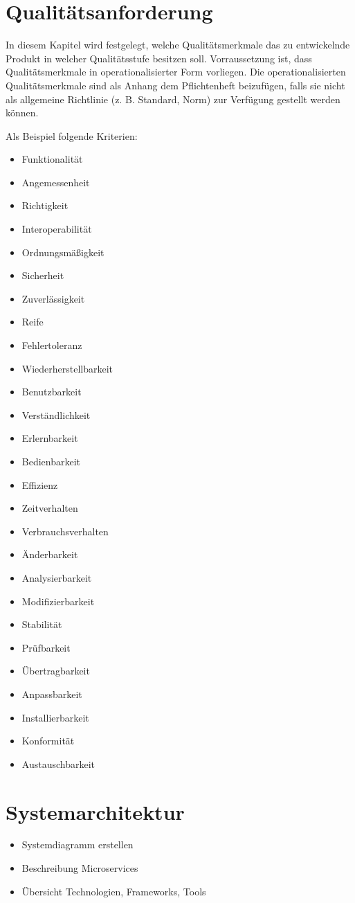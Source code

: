 \documentclass[%
	ngerman,
	12pt,
	a4paper,
	oneside,
	parskip=full
]{scrbook}
\begin{document}
\chapter{Qualitätsanforderung}
In diesem Kapitel wird festgelegt, welche Qualitätsmerkmale das zu entwickelnde Produkt in
welcher Qualitätsstufe besitzen soll. Vorraussetzung ist, dass Qualitätsmerkmale in
operationalisierter Form vorliegen. Die operationalisierten Qualitätsmerkmale sind als
Anhang dem Pflichtenheft beizufügen, falls sie nicht als allgemeine Richtlinie (z. B. Standard,
Norm) zur Verfügung gestellt werden können.

Als Beispiel folgende Kriterien:

\begin{itemize}
	\item Funktionalität
	\item Angemessenheit
	\item Richtigkeit
	\item Interoperabilität
	\item Ordnungsmäßigkeit
	\item Sicherheit
	\item Zuverlässigkeit
	\item Reife
	\item Fehlertoleranz
	\item Wiederherstellbarkeit
	\item Benutzbarkeit
	\item Verständlichkeit
	\item Erlernbarkeit
	\item Bedienbarkeit
	\item Effizienz
	\item Zeitverhalten
	\item Verbrauchsverhalten
	\item Änderbarkeit
	\item Analysierbarkeit
	\item Modifizierbarkeit
	\item Stabilität
	\item Prüfbarkeit
	\item Übertragbarkeit
	\item Anpassbarkeit
	\item Installierbarkeit
	\item Konformität
	\item Austauschbarkeit
\end{itemize}

\chapter{Systemarchitektur}
\begin{itemize}
	\item Systemdiagramm erstellen
	\item Beschreibung Microservices
	\item Übersicht Technologien, Frameworks, Tools
\end{itemize}
\end{document}
